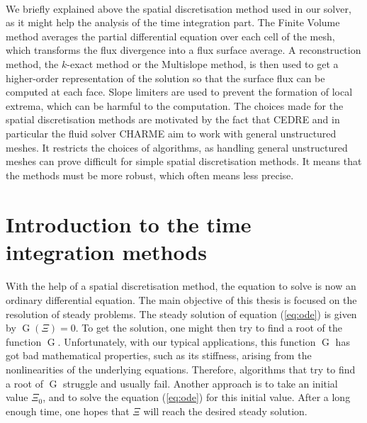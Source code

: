       \paragraph{}
      We briefly explained above the spatial discretisation method used in our solver, as it might help the analysis of the time integration part.
      The Finite Volume method averages the partial differential equation over each cell of the mesh, which transforms the flux divergence into a flux surface average.
      A reconstruction method, the $k$-exact method or the Multislope method, is then used to get a higher-order representation of the solution so that the surface flux can be computed at each face.
      Slope limiters are used to prevent the formation of local extrema, which can be harmful to the computation.
      The choices made for the spatial discretisation methods are motivated by the fact that CEDRE and in particular the fluid solver CHARME aim to work with general unstructured meshes.
      It restricts the choices of algorithms, as handling general unstructured meshes can prove difficult for simple spatial discretisation methods.
      It means that the methods must be more robust, which often means less precise.


  \section{Introduction to the time integration methods}

    \paragraph{}
    With the help of a spatial discretisation method, the equation to solve is now an ordinary differential equation.
    The main objective of this thesis is focused on the resolution of steady problems.
    The steady solution of equation (\ref{eq:ode}) is given by $\operatorname{G}\left(\Xi\right) = 0$.
    To get the solution, one might then try to find a root of the function $\operatorname{G}$.
    Unfortunately, with our typical applications, this function $\operatorname{G}$ has got bad mathematical properties, such as its stiffness, arising from the nonlinearities of the underlying equations.
    Therefore, algorithms that try to find a root of $\operatorname{G}$ struggle and usually fail.
    Another approach is to take an initial value $\Xi_0$, and to solve the equation (\ref{eq:ode}) for this initial value.
    After a long enough time, one hopes that $\Xi$ will reach the desired steady solution.

